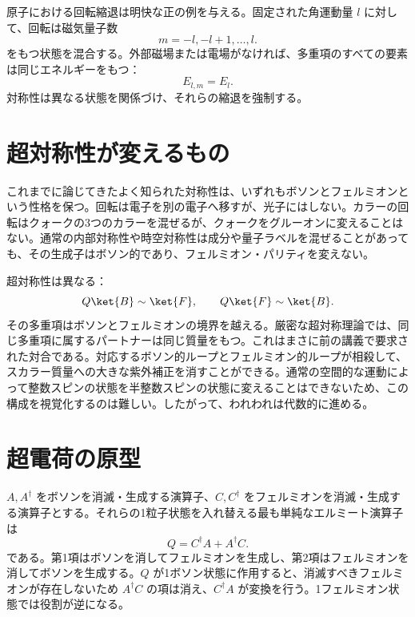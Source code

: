 原子における回転縮退は明快な正の例を与える。固定された角運動量 \(l\) に対して、回転は磁気量子数
\begin{equation}
m=-l,-l+1,\ldots,l.
\end{equation}
をもつ状態を混合する。外部磁場または電場がなければ、多重項のすべての要素は同じエネルギーをもつ：
\begin{equation}
E_{l,m}=E_l.
\end{equation}
対称性は異なる状態を関係づけ、それらの縮退を強制する。

\section{超対称性が変えるもの}

これまでに論じてきたよく知られた対称性は、いずれもボソンとフェルミオンという性格を保つ。回転は電子を別の電子へ移すが、光子にはしない。カラーの回転はクォークの3つのカラーを混ぜるが、クォークをグルーオンに変えることはない。通常の内部対称性や時空対称性は成分や量子ラベルを混ぜることがあっても、その生成子はボソン的であり、フェルミオン・パリティを変えない。

超対称性は異なる：
\begin{equation}
Q\ket{B}\sim\ket{F},
\qquad
Q\ket{F}\sim\ket{B}.
\end{equation}
その多重項はボソンとフェルミオンの境界を越える。厳密な超対称理論では、同じ多重項に属するパートナーは同じ質量をもつ。これはまさに前の講義で要求された対合である。対応するボソン的ループとフェルミオン的ループが相殺して、スカラー質量への大きな紫外補正を消すことができる。通常の空間的な運動によって整数スピンの状態を半整数スピンの状態に変えることはできないため、この構成を視覚化するのは難しい。したがって、われわれは代数的に進める。

\section{超電荷の原型}

\(A,A^\dagger\) をボソンを消滅・生成する演算子、\(C,C^\dagger\) をフェルミオンを消滅・生成する演算子とする。それらの1粒子状態を入れ替える最も単純なエルミート演算子は
\begin{equation}
Q=C^\dagger A+A^\dagger C.
\end{equation}
である。第1項はボソンを消してフェルミオンを生成し、第2項はフェルミオンを消してボソンを生成する。\(Q\) が1ボソン状態に作用すると、消滅すべきフェルミオンが存在しないため \(A^\dagger C\) の項は消え、\(C^\dagger A\) が変換を行う。1フェルミオン状態では役割が逆になる。

